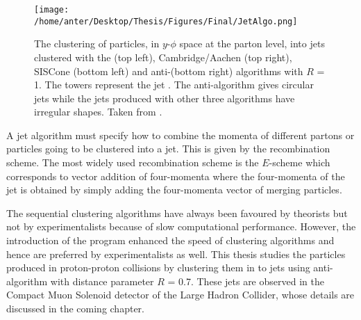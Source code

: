 \begin{figure}[!h]
\begin{center}
\hspace*{-20mm}
\texttt{[image: /home/anter/Desktop/Thesis/Figures/Final/JetAlgo.png]}\\
\vspace*{4mm}
\caption[The clustering of particles into jets using different jet algorithms.]{The clustering of particles, in $y$-$\phi$ space at the parton level, into jets clustered with the \kt (top left), Cambridge/Aachen (top right), SISCone (bottom left) and anti-\kt (bottom right) algorithms with $R$ = 1. The towers represent the jet \pt. The anti-\kt algorithm gives circular jets while the jets produced with other three algorithms have irregular shapes. Taken from \cite{Salam:2009jx}.}
\label{fig:jet_algo}
\end{center}
\end{figure}

A jet algorithm must specify how to combine the momenta of different partons or particles going to be clustered into a jet. This is given by the recombination scheme. The most widely used recombination scheme is the $E$-scheme \cite{Blazey:2000qt} which corresponds to vector addition of four-momenta where the four-momenta of the jet is obtained by simply adding the four-momenta vector of merging particles.
 
The sequential clustering algorithms have always been favoured by theorists but not by experimentalists because of slow computational performance. However, the introduction of the \fastjet program \cite{Cacciari:2011ma} enhanced the speed of clustering algorithms and hence are preferred by experimentalists as well. This thesis studies the particles produced in proton-proton collisions by clustering them in to jets using anti-\kt algorithm with distance parameter $R$ = 0.7. These jets are observed in the Compact Muon Solenoid detector of the Large Hadron Collider, whose details are discussed in the coming chapter.

